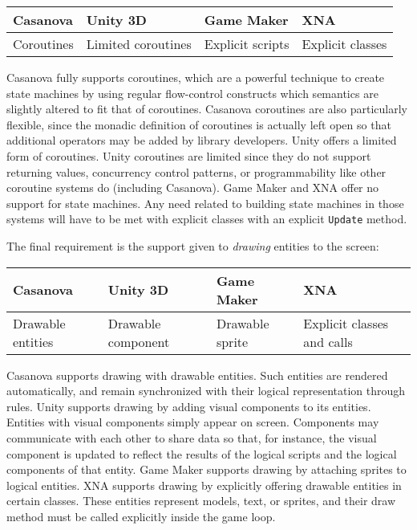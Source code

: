 \begin{tabular}{ | p{2.8cm} | p{2.8cm} | p{2.8cm} | p{2.8cm} | }
\hline
Casanova & Unity 3D & Game Maker & XNA \\
\hline
Coroutines & Limited coroutines & Explicit scripts & Explicit classes \\
\hline
\end{tabular}

Casanova fully supports coroutines, which are a powerful technique to create state machines by using regular flow-control constructs which semantics are slightly altered to fit that of coroutines. Casanova coroutines are also particularly flexible, since the monadic definition of coroutines is actually left open so that additional operators may be added by library developers.
Unity offers a limited form of coroutines. Unity coroutines are limited since they do not support returning values, concurrency control patterns, or programmability like other coroutine systems do (including Casanova).
Game Maker and XNA offer no support for state machines. Any need related to building state machines in those systems will have to be met with explicit classes with an explicit \texttt{Update} method.


The final requirement is the support given to \textit{drawing} entities to the screen:

\begin{tabular}{ | p{2.8cm} | p{2.8cm} | p{2.8cm} | p{2.8cm} | }
\hline
Casanova & Unity 3D & Game Maker & XNA \\
\hline
Drawable entities & Drawable component & Drawable sprite & Explicit classes and calls \\
\hline
\end{tabular}

Casanova supports drawing with drawable entities. Such entities are rendered automatically, and remain synchronized with their logical representation through rules.
Unity supports drawing by adding visual components to its entities. Entities with visual components simply appear on screen. Components may communicate with each other to share data so that, for instance, the visual component is updated to reflect the results of the logical scripts and the logical components of that entity.
Game Maker supports drawing by attaching sprites to logical entities.
XNA supports drawing by explicitly offering drawable entities in certain classes. These entities represent models, text, or sprites, and their draw method must be called explicitly inside the game loop.


